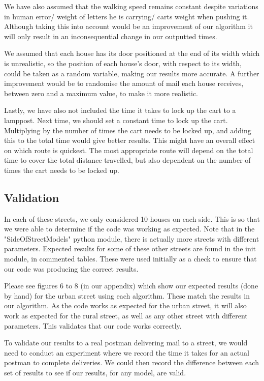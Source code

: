 \documentclass[14pt]{article}
\begin{document}
We have also assumed that the walking speed remains constant despite variations in human error/ weight of letters he is carrying/ carts weight when pushing it. Although taking this into account would be an improvement of our algorithm it will only result in an inconsequential change in our outputted times. 

We assumed that each house has its door positioned at the end of its width which is unrealistic, so the position of each house's door, with respect to its width, could be taken as a random variable, making our results more accurate. A further improvement would be to randomise the amount of mail each house receives, between zero and a maximum value, to make it more realistic. 

Lastly, we have also not included the time it takes to lock up the cart to a lamppost. Next time, we should set a constant time to lock up the cart. Multiplying by the number of times the cart needs to be locked up, and adding this to the total time would give better results. This might have an overall effect on which route is quickest. The most appropriate route will depend on the total time to cover the total distance travelled, but also dependent on the number of times the cart needs to be locked up. 

\subsection{Validation}
In each of these streets, we only considered 10 houses on each side. This is so that we were able to determine if the code was working as expected. Note that in the "SideOfStreetModels" python module, there is actually more streets with different parameters. Expected results for some of these other streets are found in the init module, in commented tables. These were used initially as a check to ensure that our code was producing the correct results. 

Please see figures 6 to 8 (in our appendix) which show our expected results (done by hand) for the urban street using each algorithm. These match the results in our algorithm. As the code works as expected for the urban street, it will also work as expected for the rural street, as well as any other street with different parameters. This validates that our code works correctly. 

To validate our results to a real postman delivering mail to a street, we would need to conduct an experiment where we record the time it takes for an actual postman to complete deliveries. We could then record the difference between each set of results to see if our results, for any model, are valid. 
\end{document}
